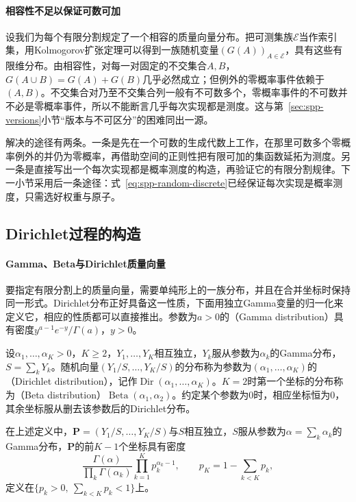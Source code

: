 \paragraph{相容性不足以保证可数可加}
设我们为每个有限分割规定了一个相容的质量向量分布。把可测集族$\mathcal E$当作索引集，用Kolmogorov扩张定理可以得到一族随机变量$(G(A))_{A\in\mathcal E}$，具有这些有限维分布。由相容性，对每一对固定的不交集合$A,B$，$G(A\cup B)=G(A)+G(B)$几乎必然成立；但例外的零概率事件依赖于$(A,B)$。不交集合对乃至不交集合列一般有不可数多个，零概率事件的不可数并不必是零概率事件，所以不能断言几乎每次实现都是测度。这与第~\ref{sec:spp-versions}小节“版本与不可区分”的困难同出一源。

解决的途径有两条。一条是先在一个可数的生成代数上工作，在那里可数多个零概率例外的并仍为零概率，再借助空间的正则性把有限可加的集函数延拓为测度。另一条是直接写出一个每次实现都是概率测度的构造，再验证它的有限分割规律。下一小节采用后一条途径：式~\eqref{eq:spp-random-discrete}已经保证每次实现是概率测度，只需选好权重与原子。

\subsection{Dirichlet过程的构造}
\label{sec:spp-dirichlet-process}

\paragraph{Gamma、Beta与Dirichlet质量向量}
要指定有限分割上的质量向量，需要单纯形上的一族分布，并且在合并坐标时保持同一形式。Dirichlet分布正好具备这一性质，下面用独立Gamma变量的归一化来定义它，相应的性质都可以直接推出。参数为$a>0$的（Gamma distribution）具有密度$y^{a-1}e^{-y}/\Gamma(a)$，$y>0$。

\begin{definition}[Dirichlet分布与Beta分布]
\label{def:spp-dirichlet-distribution}
设$\alpha_1,\ldots,\alpha_K>0$，$K\ge2$，$Y_1,\ldots,Y_K$相互独立，$Y_k$服从参数为$\alpha_k$的Gamma分布，$S=\sum_kY_k$。随机向量$(Y_1/S,\ldots,Y_K/S)$的分布称为参数为$(\alpha_1,\ldots,\alpha_K)$的（Dirichlet distribution），记作$\operatorname{Dir}(\alpha_1,\ldots,\alpha_K)$。$K=2$时第一个坐标的分布称为（Beta distribution）$\operatorname{Beta}(\alpha_1,\alpha_2)$。约定某个参数为$0$时，相应坐标恒为$0$，其余坐标服从删去该参数后的Dirichlet分布。
\end{definition}

\begin{lemma}[Gamma归一化]
\label{lem:spp-gamma-normalization}
在上述定义中，$\bm P=(Y_1/S,\ldots,Y_K/S)$与$S$相互独立，$S$服从参数为$\alpha=\sum_k\alpha_k$的Gamma分布，$\bm P$的前$K-1$个坐标具有密度
\[
  \frac{\Gamma(\alpha)}{\prod_k\Gamma(\alpha_k)}\prod_{k=1}^Kp_k^{\alpha_k-1},\qquad p_K=1-\sum_{k<K}p_k ,
\]
定义在$\{p_k>0,\ \sum_{k<K}p_k<1\}$上。
\end{lemma}

